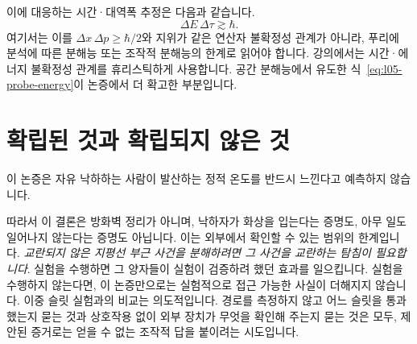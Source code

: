 이에 대응하는 시간·대역폭 추정은 다음과 같습니다.
\begin{equation}
\Delta E\,\Delta\tau\gtrsim\hbar.
\end{equation}
여기서는 이를 \(\Delta x\,\Delta p\geq\hbar/2\)와 지위가 같은 연산자 불확정성 관계가 아니라, 푸리에 분석에 따른 분해능 또는 조작적 분해능의 한계로 읽어야 합니다. 강의에서는 시간·에너지 불확정성 관계를 휴리스틱하게 사용합니다. 공간 분해능에서 유도한 식~\eqref{eq:l05-probe-energy}이 논증에서 더 확고한 부분입니다.

\begin{classroomqa}
\end{classroomqa}

\enlargethispage{2\baselineskip}
\section{확립된 것과 확립되지 않은 것}

이 논증은 자유 낙하하는 사람이 발산하는 정적 온도를 반드시 느낀다고 예측하지 않습니다.

\begin{classroomqa}
\end{classroomqa}

따라서 이 결론은 방화벽 정리가 아니며, 낙하자가 화상을 입는다는 증명도, 아무 일도 일어나지 않는다는 증명도 아닙니다. 이는 외부에서 확인할 수 있는 범위의 한계입니다. \emph{교란되지 않은 지평선 부근 사건을 분해하려면 그 사건을 교란하는 탐침이 필요합니다}.
실험을 수행하면 그 양자들이 실험이 검증하려 했던 효과를 일으킵니다. 실험을 수행하지 않는다면, 이 논증만으로는 실험적으로 접근 가능한 사실이 더해지지 않습니다. 이중 슬릿 실험과의 비교는 의도적입니다. 경로를 측정하지 않고 어느 슬릿을 통과했는지 묻는 것과 상호작용 없이 외부 장치가 무엇을 확인해 주는지 묻는 것은 모두, 제안된 증거로는 얻을 수 없는 조작적 답을 붙이려는 시도입니다.
